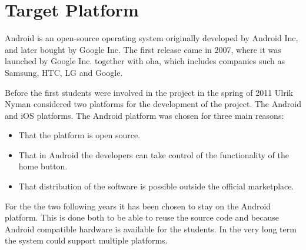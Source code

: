 \section{Target Platform}
\label{sec:platform}
Android is an open-source operating system originally developed by Android Inc, and later bought by Google Inc. The first release came in 2007, where it was launched by Google Inc. together with \ac{oha}, which includes companies such as Samsung, HTC, LG and Google.

Before the first students were involved in the project in the spring of 2011 Ulrik Nyman considered two platforms for the development of the project. The Android and iOS platforms. The Android platform was chosen for three main reasons:
\begin{itemize}
\item That the platform is open source.
\item That in Android the developers can take control of the functionality of the home button.
\item That distribution of the software is possible outside the official marketplace.
\end{itemize}

For the the two following years it has been chosen to stay on the Android platform. This is done both to be able to reuse the source code and because Android compatible hardware is available for the students.
In the very long term the system could support multiple platforms.



